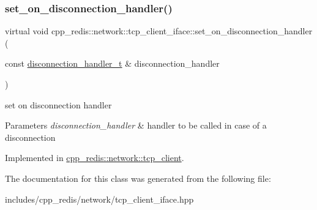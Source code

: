 \subsubsection{\texorpdfstring{set\+\_\+on\+\_\+disconnection\+\_\+handler()}{set\_on\_disconnection\_handler()}}
{\footnotesize\ttfamily virtual void cpp\+\_\+redis\+::network\+::tcp\+\_\+client\+\_\+iface\+::set\+\_\+on\+\_\+disconnection\+\_\+handler (\begin{DoxyParamCaption}\item[{const \hyperlink{classcpp__redis_1_1network_1_1tcp__client__iface_a9a7d5942205db8be03da581a848b8ec0}{disconnection\+\_\+handler\+\_\+t} \&}]{disconnection\+\_\+handler }\end{DoxyParamCaption})\hspace{0.3cm}{\ttfamily [pure virtual]}}

set on disconnection handler


\begin{DoxyParams}{Parameters}
{\em disconnection\+\_\+handler} & handler to be called in case of a disconnection \\
\hline
\end{DoxyParams}


Implemented in \hyperlink{classcpp__redis_1_1network_1_1tcp__client_a24ccdf6dc467aac13cb832a395adb38d}{cpp\+\_\+redis\+::network\+::tcp\+\_\+client}.



The documentation for this class was generated from the following file\+:\begin{DoxyCompactItemize}
\item 
includes/cpp\+\_\+redis/network/tcp\+\_\+client\+\_\+iface.\+hpp\end{DoxyCompactItemize}
